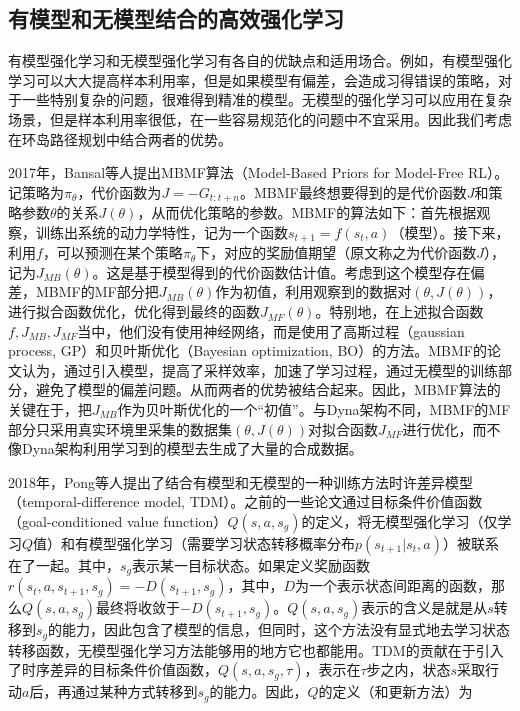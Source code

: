 \documentclass[degree=bachelor, tocarialchapter, pifootnote]{thuthesis}
\begin{document}
  \subsection{有模型和无模型结合的高效强化学习}
    有模型强化学习和无模型强化学习有各自的优缺点和适用场合。例如，有模型强化学习可以大大提高样本利用率，但是如果模型有偏差，会造成习得错误的策略，对于一些特别复杂的问题，很难得到精准的模型。无模型的强化学习可以应用在复杂场景，但是样本利用率很低，在一些容易规范化的问题中不宜采用。因此我们考虑在环岛路径规划中结合两者的优势。\par
    2017年，Bansal等人提出MBMF算法（Model-Based Priors for Model-Free RL）\cite{MBMF}。记策略为$\pi_\theta$，代价函数为$J = -G_{t:t+n}$。MBMF最终想要得到的是代价函数$J$和策略参数$\theta$的关系$J(\theta)$，从而优化策略的参数。MBMF的算法如下：首先根据观察，训练出系统的动力学特性，记为一个函数$s_{t+1} = f(s_t, a)$（模型）。接下来，利用$f$，可以预测在某个策略$\pi_\theta$下，对应的奖励值期望（原文称之为代价函数$J$），记为$J_{MB}(\theta)$。这是基于模型得到的代价函数估计值。考虑到这个模型存在偏差，MBMF的MF部分把$J_{MB}(\theta)$作为初值，利用观察到的数据对$(\theta, J(\theta))$，进行拟合函数优化，优化得到最终的函数$J_{MF}(\theta)$。特别地，在上述拟合函数$f, J_{MB}, J_{MF}$当中，他们没有使用神经网络，而是使用了高斯过程\cite{Gaussian_process}（gaussian process, GP）和贝叶斯优化\cite{Bayesian_optimization}（Bayesian optimization, BO）的方法。MBMF的论文认为，通过引入模型，提高了采样效率，加速了学习过程，通过无模型的训练部分，避免了模型的偏差问题。从而两者的优势被结合起来。因此，MBMF算法的关键在于，把$J_{MB}$作为贝叶斯优化的一个``初值''。与Dyna架构\cite{Sutton_book}不同，MBMF的MF部分只采用真实环境里采集的数据集$(\theta, J(\theta))$对拟合函数$J_{MF}$进行优化，而不像Dyna架构利用学习到的模型去生成了大量的合成数据。\par
    2018年，Pong等人提出了结合有模型和无模型的一种训练方法时许差异模型（temporal-difference model, TDM）\cite{TDM}。之前的一些论文通过目标条件价值函数（goal-conditioned value function）$Q(s, a, s_g)$的定义，将无模型强化学习（仅学习$Q$值）和有模型强化学习（需要学习状态转移概率分布$p(s_{t+1}|s_t, a)$）被联系在了一起。其中，$s_g$表示某一目标状态。如果定义奖励函数$r(s_t, a, s_{t+1}, s_g) = -D(s_{t+1}, s_g)$，其中，$D$为一个表示状态间距离的函数，那么$Q(s, a, s_g)$最终将收敛于$-D(s_{t+1}, s_g)$。$Q(s, a, s_g)$表示的含义是就是从$s$转移到$s_g$的能力，因此包含了模型的信息，但同时，这个方法没有显式地去学习状态转移函数，无模型强化学习方法能够用的地方它也都能用。TDM的贡献在于引入了时序差异的目标条件价值函数，$Q(s, a, s_g, \tau)$，表示在$\tau$步之内，状态$s$采取行动$a$后，再通过某种方式转移到$s_g$的能力。因此，$Q$的定义（和更新方法）为
\end{document}
